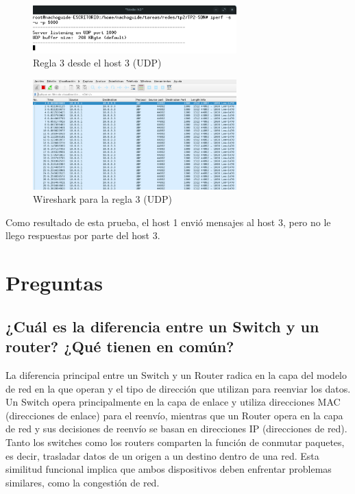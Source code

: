 \documentclass[titlepage,a4paper]{article}
\begin{document}
\begin{figure}[H]
    \centering
    \includegraphics[width=0.7\textwidth]{img/regla3_h3_udp.png}
    \caption{Regla 3 desde el host 3 (UDP)}
\end{figure}

\begin{figure}[H]
    \centering
    \includegraphics[width=0.7\textwidth]{img/regla3_wireshark_udp.png}
    \caption{Wireshark para la regla 3 (UDP)}
\end{figure}

Como resultado de esta prueba, el host 1 envió mensajes al host 3, pero no le llego respuestas por parte del host 3.


\section{Preguntas}\label{sec:preguntasAResponder}

    \subsection{¿Cuál es la diferencia entre un Switch y un router? ¿Qué tienen en común?}

    La diferencia principal entre un Switch y un Router radica en la capa del modelo de red en la que operan y el tipo de dirección que utilizan para reenviar los datos. Un Switch opera principalmente en la capa de enlace y utiliza direcciones MAC (direcciones de enlace) para el reenvío, mientras que un Router opera en la capa de red y sus decisiones de reenvío se basan en direcciones IP (direcciones de red). \\
    Tanto los switches como los routers comparten la función de conmutar paquetes, es decir, trasladar datos de un origen a un destino dentro de una red. Esta similitud funcional implica que ambos dispositivos deben enfrentar problemas similares, como la congestión de red.
    
\end{document}
